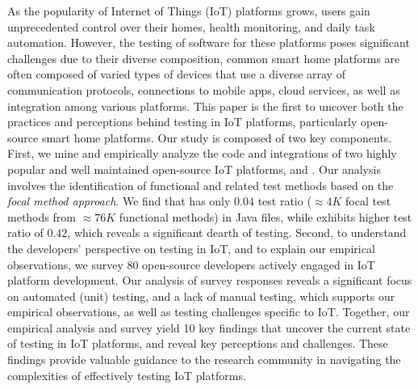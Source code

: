 As the popularity of Internet of Things (IoT) platforms grows, users gain unprecedented control over their homes, health monitoring, and daily task automation. 
However, the testing of software for these platforms poses significant challenges due to their diverse composition, \eg common smart home platforms are often composed of varied types of devices that use a diverse array of communication protocols, connections to mobile apps, cloud services, as well as integration among various platforms. 
This paper is the first to uncover both the practices and perceptions behind testing in IoT platforms, particularly open-source smart home platforms. 
Our study is composed of two key components. First, we mine and empirically analyze the code and integrations of two highly popular and well maintained open-source IoT platforms, \openhab and \homeassistant. Our analysis involves the identification of functional and related test methods based on the \textit{focal method approach}.
We find that \openhab has only $0.04$ test ratio ($\approx 4K$ focal test methods from  $\approx 76K$ functional methods) in Java files, while \homeassistant exhibits higher test ratio of $0.42$, which reveals a significant dearth of testing. Second, to understand the developers' perspective on testing in IoT, and to explain our empirical observations, we survey 80 open-source developers actively engaged in IoT platform development. 
Our analysis of survey responses reveals a significant focus on automated (unit) testing, and a lack of manual testing, which supports our empirical observations, as well as testing challenges specific to IoT. Together, our empirical analysis and survey yield 10 key findings that uncover the current state of testing in IoT platforms, and reveal key perceptions and challenges.
These findings provide valuable guidance to the research community in navigating the complexities of effectively testing IoT platforms. 








